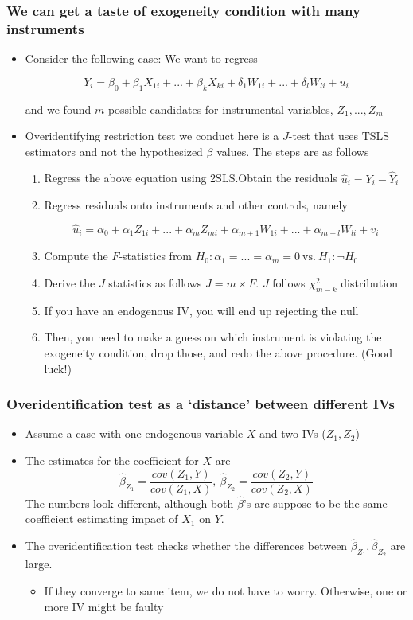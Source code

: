 \documentclass[aspectratio=169]{beamer}
\begin{document}
\begin{frame}
\frametitle{We can get a taste of exogeneity condition with many instruments}
\begin{itemize}
\item  Consider the following case: We want to regress
\begin{scriptsize}
\[
Y_i = \beta_0 + \beta_1X_{1i} +...+ \beta_kX_{ki} + \delta_1W_{1i}+...+\delta_lW_{li}+u_i 
\]
\end{scriptsize}
and we found $m$ possible candidates for instrumental variables, $Z_1,...,Z_m$
\item Overidentifying restriction test we conduct here is a $J$-test that uses TSLS estimators and not the hypothesized $\beta$ values. The steps are as follows
\begin{enumerate}
\item Regress the above equation using 2SLS.Obtain the residuals $\hat{u}_i=Y_i-\widehat{Y}_i$
\item Regress residuals onto instruments and other controls, namely
\begin{scriptsize}
\[
\hat{u}_i = \alpha_0 + \alpha_1 Z_{1i}+ ... + \alpha_m Z_{mi} + \alpha_{m+1}W_{1i}+ ... + \alpha_{m+l}W_{li}+v_i
\]
\end{scriptsize}
\item Compute the $F$-statistics from $H_0: \alpha_1 = ... = \alpha_m=0\ \text{vs.} \ H_1: \lnot H_0$
\item Derive the $J$ statistics as follows $J = m\times F$. $J$ follows $\chi^2_{m-k}$ distribution 
\item If you have an endogenous IV, you will end up rejecting the null
\item Then, you need to make a guess on which instrument is violating the exogeneity condition, drop those, and redo the above procedure. (Good luck!)
\end{enumerate}

\end{itemize}
\end{frame}


\begin{frame}
\frametitle{Overidentification test as a `distance' between different IVs}
\begin{itemize}
\item Assume a case with one endogenous variable $X$ and two IVs ($Z_1, Z_2$)
\item The estimates for the coefficient for $X$ are 
\[
\hat{\beta}_{Z_1}=\frac{cov(Z_1,Y)}{cov(Z_1,X)}, \ \hat{\beta}_{Z_2}=\frac{cov(Z_2,Y)}{cov(Z_2,X)}
\]
The numbers look different, although both $\hat{\beta}$'s are suppose to be the same coefficient estimating impact of $X_1$ on $Y$. 
\item The overidentification test checks whether the differences between $\hat{\beta}_{Z_1}, \hat{\beta}_{Z_2}$ are large.
\begin{itemize}
\item If they converge to same item, we do not have to worry. Otherwise, one or more IV might be faulty
\end{itemize}
\end{itemize}
\end{frame}
\end{document}
